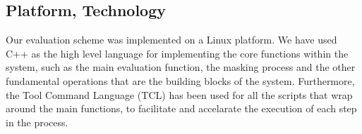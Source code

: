 \subsection{Platform, Technology}
Our evaluation scheme was implemented on a Linux platform. We have used C++ as the high level language for implementing 
the core functions within the system, such as the main evaluation function, 
the masking process and the other fundamental operations that are the building blocks of the system.
Furthermore, the Tool Command Language (TCL) has been used for all the scripts that wrap around the main functions,
to facilitate and accelarate the execution of each step in the process.

